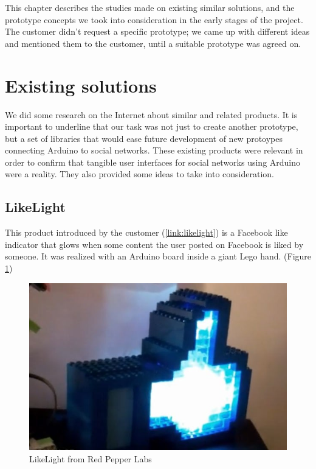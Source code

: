 
This chapter describes the studies made on existing similar solutions,
and the prototype concepts we took into consideration in the early stages of the project.
The customer didn't request a specific prototype; we came up with different ideas and mentioned
them to the customer, until a suitable prototype was agreed on.

\section{Existing solutions}
We did some research on the Internet about similar and related products. It is important to underline that our task was
not just to create another prototype, but a set of libraries that would ease future development of new protoypes
connecting Arduino to social networks. These existing products were relevant in order to confirm that tangible user interfaces
for social networks using Arduino were a reality. They also provided some ideas to take into consideration.

\newpage

\subsection{LikeLight}
This product introduced by the customer (\ref{link:likelight}) is a Facebook like indicator that glows when some content the
user posted on Facebook is liked by someone. It was realized with an Arduino board inside a giant Lego hand.
(Figure \ref{fig:prestudies-likehand})

\begin{figure}[h!]
\centering \includegraphics[scale=0.85]{img/prestudies-likehand}
\caption{LikeLight from Red Pepper Labs\cite{link:likelight}}
\label{fig:prestudies-likehand}
\end{figure}


